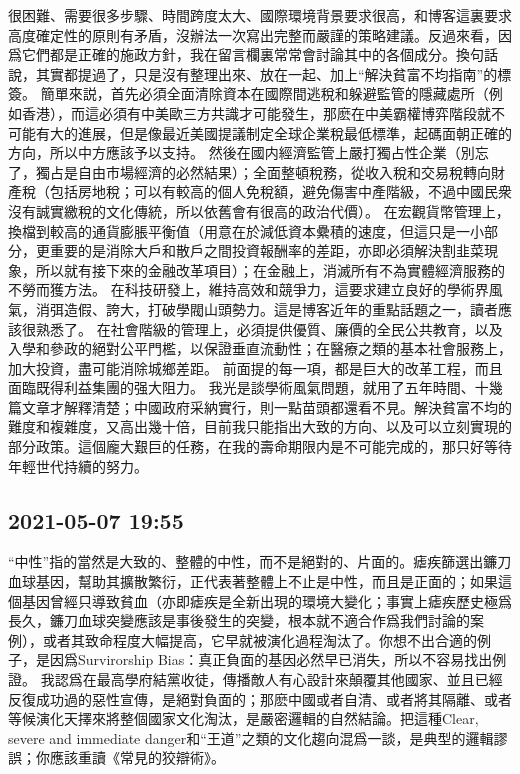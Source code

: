 \documentclass[twocolumn]{ctexart}
\begin{document}
很困難、需要很多步驟、時間跨度太大、國際環境背景要求很高，和博客這裏要求高度確定性的原則有矛盾，沒辦法一次寫出完整而嚴謹的策略建議。反過來看，因爲它們都是正確的施政方針，我在留言欄裏常常會討論其中的各個成分。換句話說，其實都提過了，只是沒有整理出來、放在一起、加上“解決貧富不均指南”的標簽。
簡單來説，首先必須全面清除資本在國際間逃稅和躲避監管的隱藏處所（例如香港），而這必須有中美歐三方共識才可能發生，那麽在中美霸權博弈階段就不可能有大的進展，但是像最近美國提議制定全球企業稅最低標準，起碼面朝正確的方向，所以中方應該予以支持。
然後在國内經濟監管上嚴打獨占性企業（別忘了，獨占是自由市場經濟的必然結果）；全面整頓稅務，從收入稅和交易稅轉向財產稅（包括房地稅；可以有較高的個人免稅額，避免傷害中產階級，不過中國民衆沒有誠實繳稅的文化傳統，所以依舊會有很高的政治代價）。
在宏觀貨幣管理上，換檔到較高的通貨膨脹平衡值（用意在於減低資本纍積的速度，但這只是一小部分，更重要的是消除大戶和散戶之間投資報酬率的差距，亦即必須解決割韭菜現象，所以就有接下來的金融改革項目）；在金融上，消滅所有不為實體經濟服務的不勞而獲方法。
在科技研發上，維持高效和競爭力，這要求建立良好的學術界風氣，消弭造假、誇大，打破學閥山頭勢力。這是博客近年的重點話題之一，讀者應該很熟悉了。
在社會階級的管理上，必須提供優質、廉價的全民公共教育，以及入學和參政的絕對公平門檻，以保證垂直流動性；在醫療之類的基本社會服務上，加大投資，盡可能消除城鄉差距。
前面提的每一項，都是巨大的改革工程，而且面臨既得利益集團的强大阻力。
我光是談學術風氣問題，就用了五年時間、十幾篇文章才解釋清楚；中國政府采納實行，則一點苗頭都還看不見。解決貧富不均的難度和複雜度，又高出幾十倍，目前我只能指出大致的方向、以及可以立刻實現的部分政策。這個龐大艱巨的任務，在我的壽命期限内是不可能完成的，那只好等待年輕世代持續的努力。
\subsection*{2021-05-07 19:55}

“中性”指的當然是大致的、整體的中性，而不是絕對的、片面的。瘧疾篩選出鐮刀血球基因，幫助其擴散繁衍，正代表著整體上不止是中性，而且是正面的；如果這個基因曾經只導致貧血（亦即瘧疾是全新出現的環境大變化；事實上瘧疾歷史極爲長久，鐮刀血球突變應該是事後發生的突變，根本就不適合作爲我們討論的案例），或者其致命程度大幅提高，它早就被演化過程淘汰了。你想不出合適的例子，是因爲Survirorship Bias：真正負面的基因必然早已消失，所以不容易找出例證。
我認爲在最高學府結黨收徒，傳播敵人有心設計來顛覆其他國家、並且已經反復成功過的惡性宣傳，是絕對負面的；那麽中國或者自清、或者將其隔離、或者等候演化天擇來將整個國家文化淘汰，是嚴密邏輯的自然結論。把這種Clear, severe and immediate danger和“王道”之類的文化趨向混爲一談，是典型的邏輯謬誤；你應該重讀《常見的狡辯術》。
\end{document}
